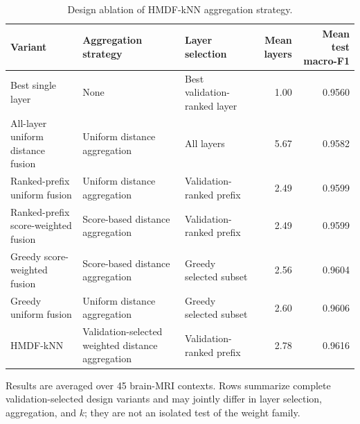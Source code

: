 \begin{table}[t]
\caption{Design ablation of HMDF-kNN aggregation strategy.}
\label{tab:ablation}
\centering
\footnotesize
\setlength{\tabcolsep}{5pt}
\begin{tabular}{p{3.5cm}p{4.7cm}p{3.8cm}rr}
\toprule
Variant & Aggregation strategy & Layer selection & Mean layers & Mean test macro-F1 \\
\midrule
Best single layer & None & Best validation-ranked layer & 1.00 & 0.9560 \\
All-layer uniform distance fusion & Uniform distance aggregation & All layers & 5.67 & 0.9582 \\
Ranked-prefix uniform fusion & Uniform distance aggregation & Validation-ranked prefix & 2.49 & 0.9599 \\
Ranked-prefix score-weighted fusion & Score-based distance aggregation & Validation-ranked prefix & 2.49 & 0.9599 \\
Greedy score-weighted fusion & Score-based distance aggregation & Greedy selected subset & 2.56 & 0.9604 \\
Greedy uniform fusion & Uniform distance aggregation & Greedy selected subset & 2.60 & 0.9606 \\
HMDF-kNN & Validation-selected weighted distance aggregation & Validation-ranked prefix & 2.78 & 0.9616 \\
\bottomrule
\end{tabular}
\par\vspace{2pt}
\footnotesize Results are averaged over 45 brain-MRI contexts. Rows summarize complete validation-selected design variants and may jointly differ in layer selection, aggregation, and $k$; they are not an isolated test of the weight family.
\end{table}
